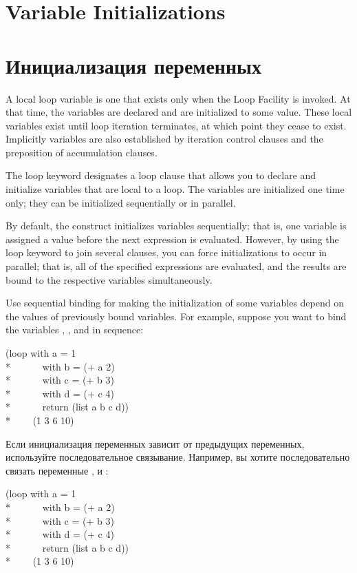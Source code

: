 \section{Variable Initializations}
\label{LOOP-VAR-SECTION}

\section{Инициализация переменных}
\label{LOOP-VAR-SECTION}

A local loop variable is one that exists only when the Loop Facility
is invoked.  At that time, the variables are declared and are
initialized to some value.  These local variables exist until loop
iteration terminates, at which point they cease to exist.  Implicitly
variables are also established by iteration control clauses and the
 preposition of accumulation clauses.

The loop keyword  designates a loop clause that allows you to 
declare and initialize variables
that are local to a loop.  The variables are initialized one time
only; they can be initialized sequentially or in parallel.

By default, the  construct initializes variables
sequentially; that is, one variable is assigned a value before the
next expression is evaluated.  However, by using the loop keyword 
 to join several  clauses, you can force
initializations to occur in parallel; that is, all of the specified
expressions are evaluated, and the results are bound to the respective
variables simultaneously.

Use sequential binding for making the initialization of
some variables depend on the values of previously bound variables.
For example, suppose you want to bind the variables , ,
and  in sequence:
\begin{lisp}
(loop with a = 1  \\*
~~~~~~with b = (+ a 2)  \\*
~~~~~~with c = (+ b 3) \\*
~~~~~~with d = (+ c 4) \\*
~~~~~~return (list a b c d)) \\*
~~~\EV~(1 3 6 10)
\end{lisp}

Если инициализация переменных зависит от предыдущих переменных,
используйте последовательное связывание. Например, вы хотите
последовательно связать переменные ,  и :
\begin{lisp}
(loop with a = 1  \\*
~~~~~~with b = (+ a 2)  \\*
~~~~~~with c = (+ b 3) \\*
~~~~~~with d = (+ c 4) \\*
~~~~~~return (list a b c d)) \\*
~~~\EV~(1 3 6 10)
\end{lisp}


